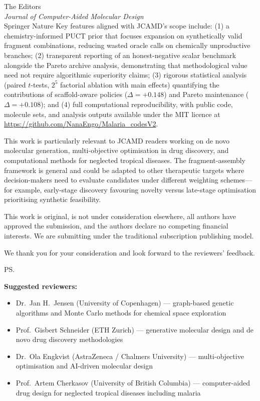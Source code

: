 \documentclass[10pt,a4paper]{letter}
\begin{document}
\begin{letter}{%
  The Editors \\
  \textit{Journal of Computer-Aided Molecular Design} \\
  Springer Nature
}
Key features aligned with JCAMD's scope include: (1) a chemistry-informed PUCT prior that focuses expansion on synthetically valid fragment combinations, reducing wasted oracle calls on chemically unproductive branches; (2) transparent reporting of an honest-negative scalar benchmark alongside the Pareto archive analysis, demonstrating that methodological value need not require algorithmic superiority claims; (3) rigorous statistical analysis (paired $t$-tests, $2^5$ factorial ablation with main effects) quantifying the contributions of scaffold-aware policies ($\Delta = +0.148$) and Pareto maintenance ($\Delta = +0.108$); and (4) full computational reproducibility, with public code, molecule sets, and analysis outputs available under the MIT licence at \url{https://github.com/NanaEngo/Malaria_codesV2}.

This work is particularly relevant to JCAMD readers working on de novo molecular generation, multi-objective optimisation in drug discovery, and computational methods for neglected tropical diseases. The fragment-assembly framework is general and could be adapted to other therapeutic targets where decision-makers need to evaluate candidates under different weighting schemes—for example, early-stage discovery favouring novelty versus late-stage optimisation prioritising synthetic feasibility.

This work is original, is not under consideration elsewhere, all authors have approved the submission, and the authors declare no competing financial interests. We are submitting under the traditional subscription publishing model.

\closing{We thank you for your consideration and look forward to the reviewers' feedback.}

\ps{%
\textbf{Suggested reviewers:}\\
\begin{itemize}[leftmargin=*, itemsep=0pt, topsep=0pt]
  \item Dr.\ Jan H.\ Jensen (University of Copenhagen) — graph-based genetic algorithms and Monte Carlo methods for chemical space exploration
  \item Prof.\ Gisbert Schneider (ETH Zurich) — generative molecular design and de novo drug discovery methodologies
  \item Dr.\ Ola Engkvist (AstraZeneca / Chalmers University) — multi-objective optimisation and AI-driven molecular design
  \item Prof.\ Artem Cherkasov (University of British Columbia) — computer-aided drug design for neglected tropical diseases including malaria
\end{itemize}
}

\end{letter}
\end{document}
